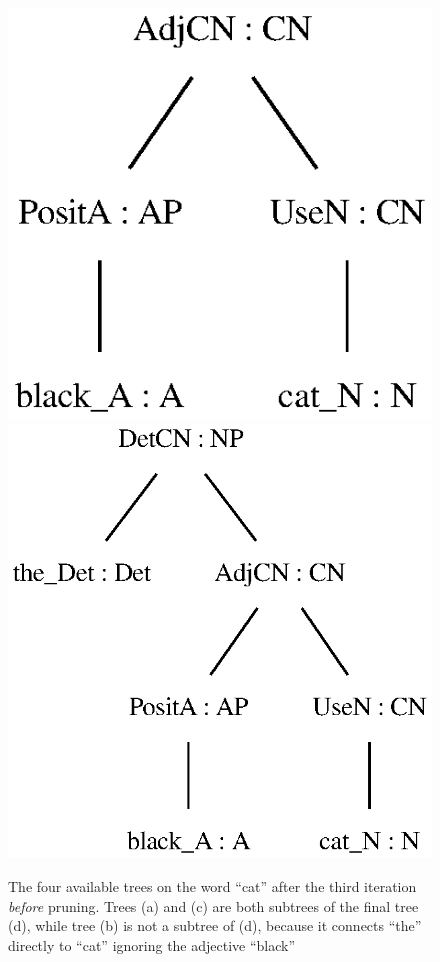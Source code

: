\begin{figure}[H]
        {\includegraphics[scale=0.75]{thesis/figure/black_cats/black_cat_CN_gf.eps}}
        {\includegraphics[scale=0.75]{thesis/figure/black_cats/the_black_cat_NP_gf.eps}}
    \caption{The four available trees on the word ``cat'' after the third iteration \emph{before} pruning. Trees (a) and (c) are both subtrees of the final tree (d), while tree (b) is not a subtree of (d), because it connects ``the'' directly to ``cat'' ignoring the adjective ``black''}\label{fig:cat iter 3}
\end{figure}


